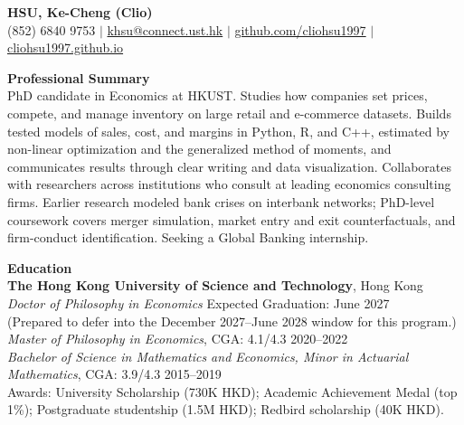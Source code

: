 \documentclass[11pt,letterpaper]{article}
\begin{document}
{\Large \textbf{HSU, Ke-Cheng (Clio)}}\\[2pt]
(852) 6840 9753 \quad $|$ \quad \href{mailto:khsu@connect.ust.hk}{khsu@connect.ust.hk} \quad $|$ \quad \href{https://github.com/cliohsu1997}{github.com/cliohsu1997} \quad $|$ \quad \href{https://cliohsu1997.github.io/}{cliohsu1997.github.io}

\vspace{1pt}

{\large \textbf{Professional Summary}}\\[1pt]
PhD candidate in Economics at HKUST. Studies how companies set prices, compete, and manage inventory on large retail and e-commerce datasets. Builds tested models of sales, cost, and margins in Python, R, and C++, estimated by non-linear optimization and the generalized method of moments, and communicates results through clear writing and data visualization. Collaborates with researchers across institutions who consult at leading economics consulting firms. Earlier research modeled bank crises on interbank networks; PhD-level coursework covers merger simulation, market entry and exit counterfactuals, and firm-conduct identification. Seeking a Global Banking internship.

\vspace{1pt}

{\large \textbf{Education}}\\[1pt]
\textbf{The Hong Kong University of Science and Technology}, Hong Kong\\
\textit{Doctor of Philosophy in Economics} \hfill Expected Graduation: June 2027\\
\hspace*{0pt}(Prepared to defer into the December 2027--June 2028 window for this program.)\\[-2pt]
\textit{Master of Philosophy in Economics}, CGA: 4.1/4.3 \hfill 2020--2022\\
\textit{Bachelor of Science in Mathematics and Economics, Minor in Actuarial Mathematics}, CGA: 3.9/4.3 \hfill 2015--2019\\
Awards: University Scholarship (730K HKD); Academic Achievement Medal (top 1\%); Postgraduate studentship (1.5M HKD); Redbird scholarship (40K HKD).

\vspace{1pt}
\end{document}
